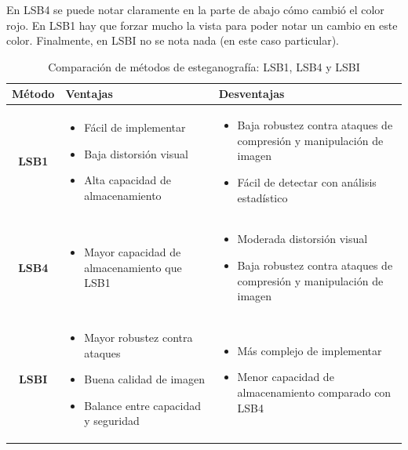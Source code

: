 \documentclass[a4paper,12pt]{article}
\begin{document}
\begin{itemize}
\begin{itemize}
		
	
		En LSB4 se puede notar claramente en la parte de abajo cómo cambió el color rojo. En LSB1 hay que forzar mucho la vista para poder notar un cambio en este color. Finalmente, en LSBI no se nota nada (en este caso particular).
		
		\begin{table}[H]
			\centering
			\begin{tabular}{|c|p{7cm}|p{7cm}|}
				\hline
				\textbf{Método} & \textbf{Ventajas} & \textbf{Desventajas} \\
				\hline
				\textbf{LSB1} & 
				\begin{itemize}
					\item Fácil de implementar
					\item Baja distorsión visual
					\item Alta capacidad de almacenamiento
				\end{itemize} &
				\begin{itemize}
					\item Baja robustez contra ataques de compresión y manipulación de imagen
					\item Fácil de detectar con análisis estadístico
				\end{itemize} \\
				\hline
				\textbf{LSB4} & 
				\begin{itemize}
					\item Mayor capacidad de almacenamiento que LSB1
					
				\end{itemize} &
				\begin{itemize}
					\item Moderada distorsión visual
					\item Baja robustez contra ataques de compresión y manipulación de imagen
				\end{itemize} \\
				\hline
				\textbf{LSBI} & 
				\begin{itemize}
					\item Mayor robustez contra ataques
					\item Buena calidad de imagen
					\item Balance entre capacidad y seguridad
				\end{itemize} &
				\begin{itemize}
					\item Más complejo de implementar
					\item Menor capacidad de almacenamiento comparado con LSB4
				\end{itemize} \\
				\hline
			\end{tabular}
			\caption{Comparación de métodos de esteganografía: LSB1, LSB4 y LSBI}
			\label{tab:comparison}
		\end{table}
		

\end{itemize}
\end{itemize}
\end{document}

